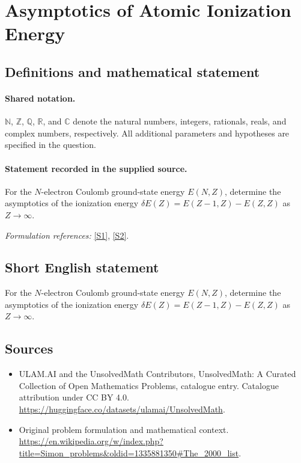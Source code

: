 \documentclass[11pt]{article}
\newcommand{\sref}[2]{\hyperlink{source:#1:#2}{[S#2]}}
\begin{document}
\section{Asymptotics of Atomic Ionization Energy}\label{statement}

\subsection{Definitions and mathematical statement}

\paragraph{Shared notation.}$\mathbb N$, $\mathbb Z$, $\mathbb Q$, $\mathbb R$, and $\mathbb C$ denote the natural numbers, integers, rationals, reals, and complex numbers, respectively. All additional parameters and hypotheses are specified in the question.


\paragraph{Statement recorded in the supplied source.}
For the $N$-electron Coulomb ground-state energy $E(N,Z)$, determine the asymptotics of the ionization energy $\delta E(Z)=E(Z-1,Z)-E(Z,Z)$ as $Z\to\infty$.
\par\smallskip\textit{Formulation references:} \sref{statement}{1}, \sref{statement}{2}.
\subsection{Short English statement}
For the $N$-electron Coulomb ground-state energy $E(N,Z)$, determine the asymptotics of the ionization energy $\delta E(Z)=E(Z-1,Z)-E(Z,Z)$ as $Z\to\infty$.
\subsection{Sources}
\begin{itemize}
\item[\hypertarget{source:statement:1}{S1}] ULAM.AI and the UnsolvedMath Contributors, UnsolvedMath: A Curated Collection of Open Mathematics Problems, catalogue entry. Catalogue attribution under CC BY 4.0.
\url{https://huggingface.co/datasets/ulamai/UnsolvedMath}.
\item[\hypertarget{source:statement:2}{S2}] Original problem formulation and mathematical context.
\url{https://en.wikipedia.org/w/index.php?title=Simon_problems&oldid=1335881350#The_2000_list}.
\end{itemize}
\label{end:statement}
\end{document}
